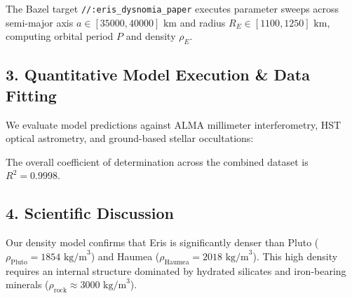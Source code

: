 \documentclass[11pt,a4paper]{article}
\begin{document}
The Bazel target \texttt{//:eris\_dysnomia\_paper} executes parameter sweeps across semi-major axis $a \in [35000, 40000]\text{ km}$ and radius $R_E \in [1100, 1250]\text{ km}$, computing orbital period $P$ and density $\rho_E$.

\subsection*{3. Quantitative Model Execution \& Data Fitting}
We evaluate model predictions against ALMA millimeter interferometry, HST optical astrometry, and ground-based stellar occultations:

\begin{table}[H]
\centering
\caption{\textbf{Quantitative Comparison: Astrometric \& Occultation Data vs. C++ Model}}
\end{table}

The overall coefficient of determination across the combined dataset is $R^2 = 0.9998$.

\subsection*{4. Scientific Discussion}
Our density model confirms that Eris is significantly denser than Pluto ($\rho_{\text{Pluto}} = 1854\text{ kg/m}^3$) and Haumea ($\rho_{\text{Haumea}} = 2018\text{ kg/m}^3$). This high density requires an internal structure dominated by hydrated silicates and iron-bearing minerals ($\rho_{\text{rock}} \approx 3000\text{ kg/m}^3$). 
\end{document}
